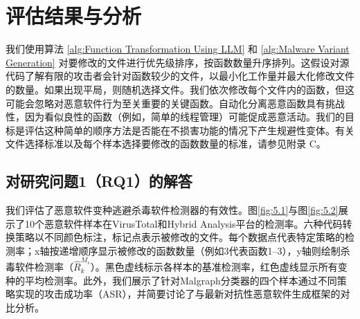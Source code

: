 \section{评估结果与分析}
我们使用算法 \ref{alg:Function Transformation Using LLM} 和 \ref{alg:Malware Variant Generation} 对要修改的文件进行优先级排序，按函数数量升序排列。这假设对源代码了解有限的攻击者会针对函数较少的文件，以最小化工作量并最大化修改文件的数量。如果出现平局，则随机选择文件。我们依次修改每个文件内的函数，但这可能会忽略对恶意软件行为至关重要的关键函数。自动化分离恶意函数具有挑战性，因为看似良性的函数（例如，简单的线程管理）可能促成恶意活动。我们的目标是评估这种简单的顺序方法是否能在不损害功能的情况下产生规避性变体。有关文件选择标准以及每个样本选择要修改的函数数量的标准，请参见附录 C。

\subsection{对研究问题1（RQ1）的解答}
我们评估了恶意软件变种逃避杀毒软件检测器的有效性。图\ref{fig:5.1}与图\ref{fig:5.2}展示了10个恶意软件样本在VirusTotal和Hybrid Analysis平台的检测率。六种代码转换策略以不同颜色标注，标记点表示被修改的文件。每个数据点代表特定策略的检测率；x轴按递增顺序显示被修改的函数数量（例如3代表函数1–3），y轴则绘制杀毒软件检测率（$\hat{R}_k^{M_{s}}$）。黑色虚线标示各样本的基准检测率，红色虚线显示所有变种的平均检测率。此外，我们展示了针对Malgraph分类器的四个样本通过不同策略实现的攻击成功率（ASR），并简要讨论了与最新对抗性恶意软件生成框架的对比分析。

